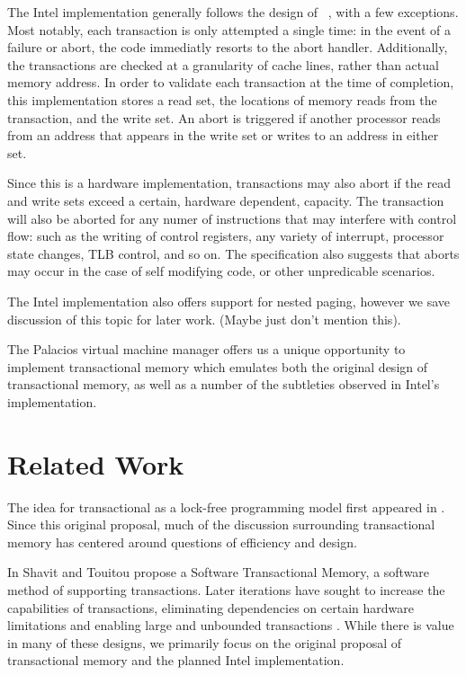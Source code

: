 \documentclass{acm_proc_article-sp}
\begin{document}
The Intel implementation generally follows the design of 
~\cite{Herlihy:1993:TMA:173682.165164}, with a few exceptions.
Most notably, each transaction is only attempted a single time: in the event
of a failure or abort, the code immediatly resorts to the abort handler. 
Additionally, the transactions are checked at a granularity of cache lines, 
rather than actual memory address. In order to validate each transaction at the
time of completion, this implementation stores a read set, the locations of
memory reads from the transaction, and the write set. An abort is triggered
if another processor reads from an address that appears in the write set or 
writes to an address in either set.

Since this is a hardware implementation, transactions may also abort if the 
read and write sets exceed a certain, hardware dependent, capacity. The 
transaction will also be aborted for any numer of instructions that may 
interfere with control flow: such as the writing of control registers, any 
variety of interrupt, processor state changes, TLB control, and so on. The 
specification also suggests that aborts may occur in the case of self modifying
code, or other unpredicable scenarios.

The Intel implementation also offers support for nested paging, however we
save discussion of this topic for later work. (Maybe just don't mention this). 

The Palacios virtual machine manager offers us a unique opportunity to
implement transactional memory which emulates both the original design of
transactional memory, as well as a number of the subtleties observed in 
Intel's implementation.

\section{Related Work}

The idea for transactional as a lock-free programming model first appeared in
 \cite{Herlihy:1993:TMA:173682.165164}. Since this original proposal, much of
the discussion surrounding transactional memory has centered around questions 
of efficiency and design.

In \cite{Shavit:1995:STM:224964.224987} Shavit and Touitou propose a Software
Transactional Memory, a software method of supporting transactions. Later 
iterations have sought to increase the capabilities of transactions, 
eliminating dependencies on certain hardware limitations and enabling 
large and unbounded transactions 
\cite{Ananian:2006:UTM:1116644.1116670, Hammond:2004:TMC:1028176.1006711,
Rajwar:2005:VTM:1080695.1070011}. While there is value in many of these 
designs, we primarily focus on the original proposal of transactional memory
and the planned Intel implementation.  
\end{document}
